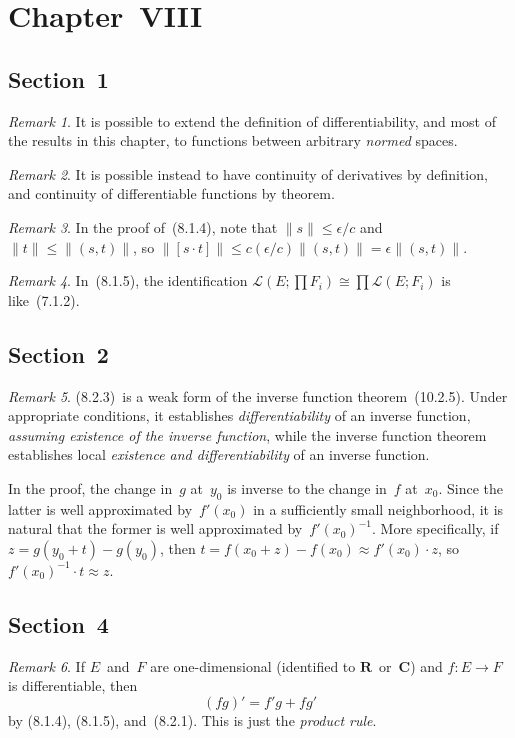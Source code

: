 \documentclass[letterpaper,12pt]{article}
\newcommand{\R}{\mathbf{R}}
\newcommand{\C}{\mathbf{C}}
\renewcommand{\L}{\mathcal{L}}
\newcommand{\at}{\cdot}
\newcommand{\iso}{\cong}
\newcommand{\inv}[1]{#1^{-1}}
\newcommand{\norm}[1]{\lVert{#1}\rVert}
\newcommand{\cbprod}[2]{[{#1}\cdot{#2}]}
\theoremstyle{plain}
\theoremstyle{definition}
\theoremstyle{remark}
\newtheorem*{rmk}{Remark}
\begin{document}
\section*{Chapter~VIII}
\subsection*{Section~1}
\begin{rmk}
It is possible to extend the definition of differentiability, and most of the results in this chapter, to functions between arbitrary \emph{normed} spaces.
\end{rmk}

\begin{rmk}
It is possible instead to have continuity of derivatives by definition, and continuity of differentiable functions by theorem.
\end{rmk}

\begin{rmk}
In the proof of~(8.1.4), note that \(\norm{s}\le\epsilon/c\) and \(\norm{t}\le\norm{(s,t)}\), so \(\norm{\cbprod{s}{t}}\le c(\epsilon/c)\norm{(s,t)}=\epsilon\norm{(s,t)}\).
\end{rmk}

\begin{rmk}
In~(8.1.5), the identification \(\L(E;\prod F_i)\iso\prod\L(E;F_i)\) is like~(7.1.2).
\end{rmk}

\subsection*{Section~2}
\begin{rmk}
(8.2.3)~is a weak form of the inverse function theorem~(10.2.5). Under appropriate conditions, it establishes \emph{differentiability} of an inverse function, \emph{assuming existence of the inverse function}, while the inverse function theorem establishes local \emph{existence and differentiability} of an inverse function.

In the proof, the change in~\(g\) at~\(y_0\) is inverse to the change in~\(f\) at~\(x_0\). Since the latter is well approximated by~\(f'(x_0)\) in a sufficiently small neighborhood, it is natural that the former is well approximated by~\(\inv{f'(x_0)}\). More specifically, if \(z=g(y_0+t)-g(y_0)\), then \(t=f(x_0+z)-f(x_0)\approx f'(x_0)\at z\), so \(\inv{f'(x_0)}\at t\approx z\).
\end{rmk}

\subsection*{Section~4}
\begin{rmk}
If \(E\)~and~\(F\) are one-dimensional (identified to \(\R\)~or~\(\C\)) and \(f:E\to F\) is differentiable, then
\[(fg)'=f'g+fg'\]
by (8.1.4), (8.1.5), and~(8.2.1). This is just the \emph{product rule}.
\end{rmk}
\end{document}
